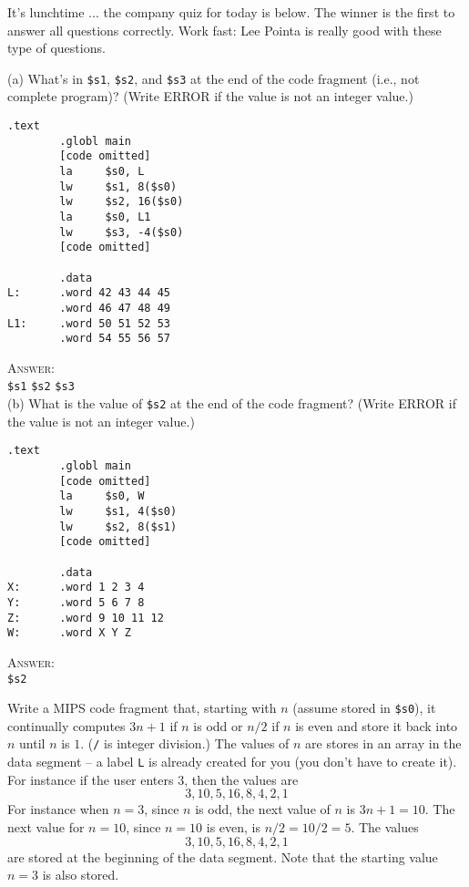 \newpage
\nextq
It's lunchtime ... the company quiz for today is below.
The winner is the first to answer all questions correctly.
Work fast: Lee Pointa is really good with these type of questions.

(a) What's in \verb!$s1!, \verb!$s2!, and \verb!$s3!
at the end of the code fragment (i.e., not complete program)?
(Write ERROR if the value is not an integer value.)
\begin{Verbatim}[frame=single,fontsize=\small]
        .text
        .globl main        
        [code omitted]
        la     $s0, L
        lw     $s1, 8($s0)
        lw     $s2, 16($s0)
        la     $s0, L1
        lw     $s3, -4($s0)
        [code omitted]
        
        .data
L:      .word 42 43 44 45
        .word 46 47 48 49
L1:     .word 50 51 52 53
        .word 54 55 56 57
\end{Verbatim}
\textsc{Answer:}
\\
\verb!$s1!  \hspace{1cm}
\verb!$s2!  \hspace{1cm}
\verb!$s3!  \\

(b)
What is the value of \verb!$s2! at the end of the code fragment?
(Write ERROR if the value is not an integer value.)
\begin{Verbatim}[frame=single,fontsize=\small]
        .text
        .globl main        
        [code omitted]
        la     $s0, W
        lw     $s1, 4($s0)
        lw     $s2, 8($s1)
        [code omitted]
        
        .data
X:      .word 1 2 3 4
Y:      .word 5 6 7 8
Z:      .word 9 10 11 12
W:      .word X Y Z
\end{Verbatim}
\textsc{Answer:} \\
\verb!$s2! 

\newpage
\nextq
Write a MIPS code fragment that, starting with $n$ (assume stored in
\verb!$s0!),
it
continually computes $3n + 1$ if $n$ is odd or $n/2$
if $n$ is even
and store it back into $n$ until $n$ is $1$.
(\verb!/! is integer division.)
The values of $n$ are stores in an array in the data segment --
a label \verb!L! is already created for you (you don't have to create it).
For instance if the user
enters $3$, then the values are
\[
  3, 10, 5, 16, 8, 4, 2, 1
\]
For instance when $n = 3$, since $n$ is odd,
the next value of $n$ is $3n + 1 = 10$.
The next value for $n = 10$, since $n = 10$ is even,
is $n / 2 = 10 / 2 = 5$.
The values
\[
  3, 10, 5, 16, 8, 4, 2, 1
\]
are stored at the beginning of the data
segment.
Note that the starting value $n = 3$ is also stored.

